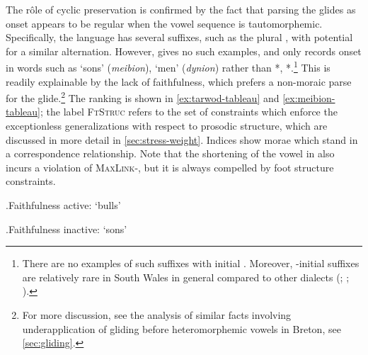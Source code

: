 The rôle of cyclic preservation is confirmed by the fact that parsing the glides as onset appears to be regular when the vowel sequence is tautomorphemic. Specifically, the language has several suffixes, such as the plural , with potential for a similar alternation. However, \citet{awbery86:_pembr_welsh} gives no such examples, and \citet{thomas00:_welsh} only records onset \ipa{[i]} in words such as \ipa{[ˈmeibjon]} `sons' (\emph{meibion}), \ipa{[ˈdinjon]} `men' (\emph{dynion}) rather than *\ipa{[meiˈbiːon]}, *\ipa{[dəˈniːon]}.\footnote{\label{fn:yod-suffixes}There are no examples of such suffixes with initial \ipa{[u]}. Moreover, \ipa{[i]}-initial suffixes are relatively rare in South Wales in general compared to other dialects (\citealt[p.~35]{thomas89:_cymraeg_cymra_cymre}; \citealt{thomas93:_middl_welsh}; \citealt[ch.~10]{wmffre03:_languag_wales}).} This is readily explainable by the lack of faithfulness, which prefers a non-moraic parse for the glide.\footnote{For more discussion, see the analysis of similar facts involving underapplication of gliding before heteromorphemic vowels in Breton, see \cref{sec:gliding}.} The ranking is shown in \ref{ex:tarwod-tableau} and \ref{ex:meibion-tableau}; the label \textsc{FtStruc} refers to the set of constraints which enforce the exceptionless generalizations with respect to prosodic structure, which are discussed in more detail in \cref{sec:stress-weight}. Indices show morae which stand in a correspondence relationship. Note that the shortening of the vowel \ipa{[aː]} in \ipa{[taˈruːod]} also incurs a violation of \textsc{MaxLink}-\mo, but it is always compelled by foot structure constraints.

\ex.\label{ex:tarwod-tableau}Faithfulness active: \ipa{[taˈruːod]} `bulls'\\

\ex.\label{ex:meibion-tableau}Faithfulness inactive: \ipa{[ˈmeibjon]} `sons'\\

